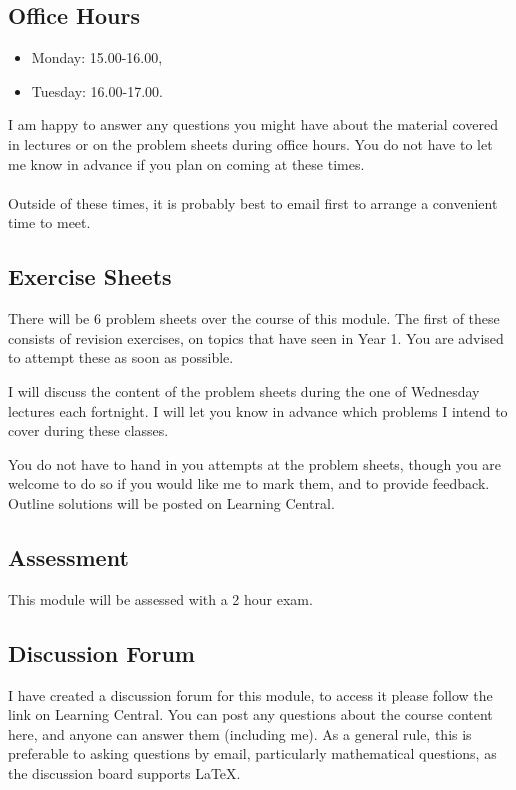 \subsection*{Office Hours}
\begin{itemize}
\item Monday: 15.00-16.00,
\item Tuesday: 16.00-17.00.
\end{itemize}
I am happy to answer any questions you might have about the material covered in lectures or on the problem sheets during office hours.  You do not have to let me know in advance if you plan on coming at these times.\\~\\
Outside of these times, it is probably best to email first to arrange a convenient time to meet.



 


\subsection*{Exercise Sheets}

There will be 6 problem sheets over the course of this module. The first of these consists of revision exercises, on topics that have seen in Year 1.  You are advised to attempt these as soon as possible.  

I will discuss the content of the problem sheets during the one of Wednesday lectures each fortnight.  I will let you know in advance which problems I intend to cover during these classes.

You do not have to hand in you attempts at the problem sheets, though you are welcome to do so if you would like me to mark them, and to provide feedback.  Outline solutions will be posted on Learning Central.


\subsection*{Assessment}
This module will be assessed with a 2 hour exam.  

\subsection*{Discussion Forum}
I have created a discussion forum for this module, to access it please follow the link on Learning Central.  You can post any questions about the course content here, and anyone can answer them (including me).  As a general rule, this is preferable to asking questions by email, particularly mathematical questions, as the discussion board supports \LaTeX.  

